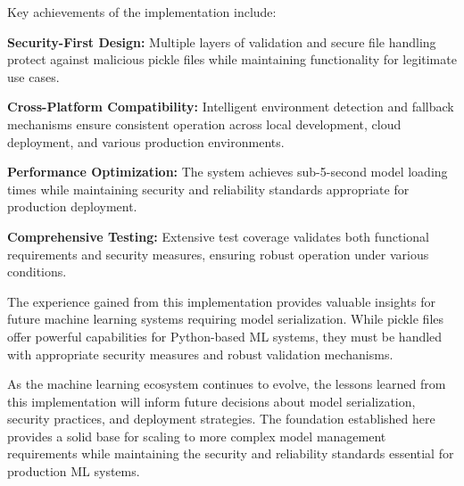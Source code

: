 Key achievements of the implementation include:

\textbf{Security-First Design:} Multiple layers of validation and secure file handling protect against malicious pickle files while maintaining functionality for legitimate use cases.

\textbf{Cross-Platform Compatibility:} Intelligent environment detection and fallback mechanisms ensure consistent operation across local development, cloud deployment, and various production environments.

\textbf{Performance Optimization:} The system achieves sub-5-second model loading times while maintaining security and reliability standards appropriate for production deployment.

\textbf{Comprehensive Testing:} Extensive test coverage validates both functional requirements and security measures, ensuring robust operation under various conditions.

The experience gained from this implementation provides valuable insights for future machine learning systems requiring model serialization. While pickle files offer powerful capabilities for Python-based ML systems, they must be handled with appropriate security measures and robust validation mechanisms.

As the machine learning ecosystem continues to evolve, the lessons learned from this implementation will inform future decisions about model serialization, security practices, and deployment strategies. The foundation established here provides a solid base for scaling to more complex model management requirements while maintaining the security and reliability standards essential for production ML systems.